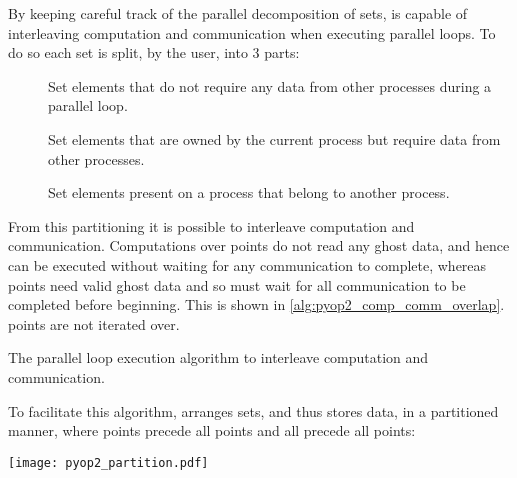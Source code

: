 \documentclass[thesis]{subfiles}
\begin{document}
By keeping careful track of the parallel decomposition of sets,  is capable of interleaving computation and communication when executing parallel loops.
To do so each set is split, by the user, into 3 parts:
\begin{description}
  \item[\coreiter{}]
    Set elements that do not require any data from other processes during a parallel loop.
  \item[\ownediter{}]
    Set elements that are owned by the current process but require data from other processes.
  \item[\ghostiter{}]
    Set elements present on a process that belong to another process.
\end{description}
From this partitioning it is possible to interleave computation and communication.
Computations over \coreiter{} points do not read any ghost data, and hence can be executed without waiting for any communication to complete, whereas \ownediter{} points need valid ghost data and so must wait for all communication to be completed before beginning.
This is shown in \cref{alg:pyop2_comp_comm_overlap}.
\ghostiter{} points are not iterated over.

\begin{algorithm}
  \caption{The  parallel loop execution algorithm to interleave computation and communication.}
  \begin{algorithmic}[1]
    \State {} 

     
      \State {}
    \EndFor

    \State {} 

     
      \State {}
    \EndFor
  \end{algorithmic}
  \label{alg:pyop2_comp_comm_overlap}
\end{algorithm}


To facilitate this algorithm,  arranges sets, and thus stores data, in a partitioned manner, where \coreiter{} points precede all \ownediter{} points and all \ownediter{} precede all \ghostiter{} points:
\begin{center}
  \texttt{[image: pyop2\_partition.pdf]}
\end{center}
\end{document}
